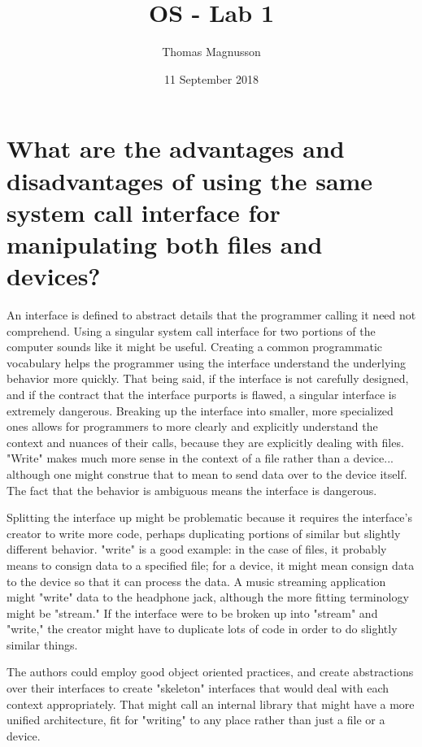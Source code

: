\documentclass{article}
\title{OS - Lab 1}
\author{Thomas Magnusson }
\date{11 September 2018}
\begin{document}
\maketitle

\section{What are the advantages and disadvantages of using the same system call interface	
for	manipulating both files and devices?}

An interface is defined to abstract details that the programmer calling it need not comprehend. Using a singular system call interface for two portions of the computer sounds like it might be useful. Creating a common programmatic vocabulary helps the programmer using the interface understand the underlying behavior more quickly. That being said, if the interface is not carefully designed, and if the contract that the interface purports is flawed, a singular interface is extremely dangerous. Breaking up the interface into smaller, more specialized ones allows for programmers to more clearly and explicitly understand the context and nuances of their calls, because they are explicitly dealing with files. "Write" makes much more sense in the context of a file rather than a device... although one might construe that to mean to send data over to the device itself. The fact that the behavior is ambiguous means the interface is dangerous.

Splitting the interface up might be problematic because it requires the interface's creator to write more code, perhaps duplicating portions of similar but slightly different behavior. "write" is a good example: in the case of files, it probably means to consign data to a specified file; for a device, it might mean consign data to the device so that it can process the data. A music streaming application might "write" data to the headphone jack, although the more fitting terminology might be "stream." If the interface were to be broken up into "stream" and "write," the creator might have to duplicate lots of code in order to do slightly similar things.

The authors could employ good object oriented practices, and create abstractions over their interfaces to create "skeleton" interfaces that would deal with each context appropriately. That might call an internal library that might have a more unified architecture, fit for "writing" to any place rather than just a file or a device.
\end{document}
